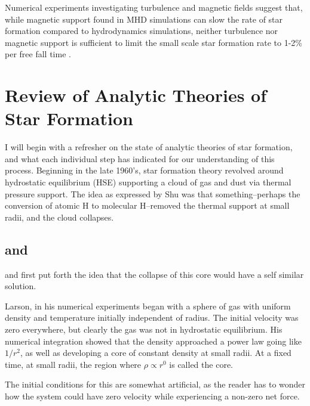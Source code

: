 \documentclass[../dissertation.tex]{subfiles}
\begin{document}
Numerical experiments investigating turbulence and magnetic fields suggest that, while magnetic support found in MHD simulations can slow the rate of star formation 
compared to hydrodynamics simulations, neither turbulence nor magnetic support is sufficient to limit the small scale star formation rate to 1-2\% per free fall time
\citep{2010ApJ...709...27W,2011MNRAS.410L...8C,2011ApJ...730...40P,2012ApJ...754...71K,2014MNRAS.439.3420M,2015ApJ...808...48B,2017ApJ...838...40M}.

\section{Review of Analytic Theories of Star Formation} \label{sec:sf_review}
I will begin with a refresher on the state of analytic theories of star formation, and what each individual step has indicated for our understanding of this process.
Beginning in the late 1960's, star formation theory revolved around hydrostatic equilibrium (HSE) supporting a cloud of gas and dust via thermal pressure support. 
The idea as expressed by Shu was that something--perhaps the conversion of atomic H to molecular H--removed the thermal support at small radii, and the cloud collapses.

\subsection{\citet{1969MNRAS.145..271L} and \citet{1969MNRAS.144..425P}}
\citet{1969MNRAS.145..271L} and \citet{1969MNRAS.144..425P} first put forth the idea that the collapse of this core would have a self similar solution. 

Larson, in his numerical experiments began with a sphere of gas with  uniform density and temperature initially independent of radius. 
The initial velocity was zero everywhere, but clearly the gas was not in hydrostatic equilibrium. His numerical integration showed that the density approached a power law going like $1/r^2$, as well as developing a core of constant density at small radii. At a fixed time, at small radii, the region where $\rho \propto r^0$ is called the core. 

The initial conditions for this are somewhat artificial, as the reader has to wonder how the system could have zero velocity while experiencing a non-zero net force.


\end{document}

